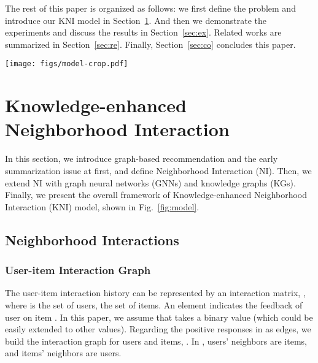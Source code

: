 \documentclass[sigconf]{acmart}
\newcommand{\new}[1]{{\color{black} #1}}
\begin{document}
The rest of this paper is organized as follows: we first define the problem and introduce our KNI model in Section~\ref{sec:me}. And then we demonstrate the experiments and discuss the results in Section~\ref{sec:ex}. Related works are summarized in Section~\ref{sec:re}. Finally, Section~\ref{sec:co} concludes this paper.

\begin{figure*}
    \centering
    \texttt{[image: figs/model-crop.pdf]}
    \caption{Model overview. \emph{Note}: Red circles denote users. Green circles denote rated or unseen items. Blue circles denote non-item entities. Dash circles denote user and item neighborhoods. In this example, a KIG is constructed at first, and then higher hop neighborhood information is aggregated into local neighbors. Finally, the user and item neighborhoods are collected to compute neighborhood interactions.} \label{fig:model}
\end{figure*}

\section{Knowledge-enhanced Neighborhood Interaction} \label{sec:me}
\new{In this section, we introduce graph-based recommendation and the early summarization issue at first, and define Neighborhood Interaction (NI). Then, we extend NI with graph neural networks (GNNs) and knowledge graphs (KGs). Finally, we present the overall framework of Knowledge-enhanced Neighborhood Interaction (KNI) model, shown in Fig.~\ref{fig:model}.}

\subsection{Neighborhood Interactions}\label{sec:ni}



\subsubsection{User-item Interaction Graph} The user-item interaction history can be represented by an interaction matrix, , where  is the set of users,  the set of items.
An element  indicates the feedback of user  on item . In this paper,
we assume that  takes a binary value (which could be easily extended to other values). 
Regarding the positive responses in  as edges, we build the interaction graph for users and items, . In , users' neighbors are items, and items' neighbors are users. 
\end{document}
